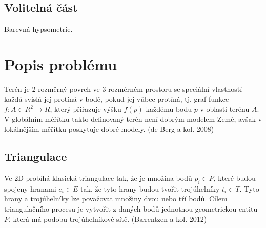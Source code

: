 \documentclass{article}
\begin{document}
\subsection{\small{Volitelná část}}
Barevná hypsometrie.
\clearpage
\newpage
\section{\large{Popis problému}}
Terén je 2-rozměrný povrch ve 3-rozměrném prostoru se speciální vlastností - každá svislá jej protíná v bodě, pokud jej vůbec protíná, tj. graf funkce $f: A \in R^2 \rightarrow R$, který přiřazuje výšku $f(p)$ každému bodu $p$ v oblasti terénu $A$. V globálním měřítku takto definovaný terén není dobrým modelem Země, avšak v lokálnějším měřítku poskytuje dobré modely. (de Berg a kol. 2008)
\subsection{\large{Triangulace}}
Ve 2D probíhá klasická triangulace tak, že je množina bodů $p_{i} \in P$, které budou spojeny hranami $e_{i} \in E$ tak, že tyto hrany budou tvořit trojúhelníky $t_{i} \in T$. Tyto hrany a trojúhelníky lze považovat množiny dvou nebo tří bodů. Cílem triangulačního procesu je vytvořit z daných bodů jednotnou geometrickou entitu $P$, která má podobu trojúhelníkové sítě. (Bærentzen a kol. 2012)
\end{document}
